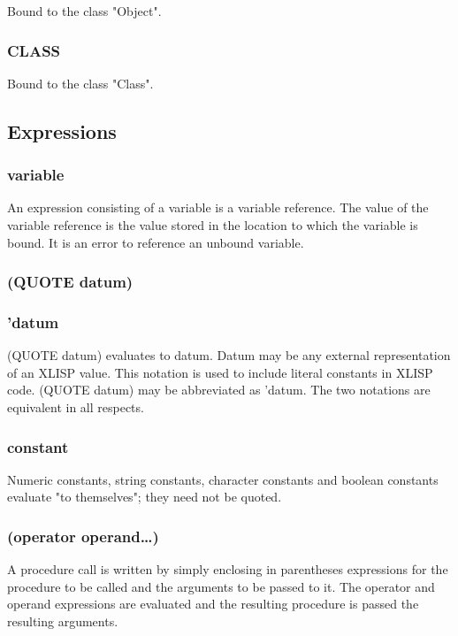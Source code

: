 \documentclass[11pt]{article}
\begin{document}
Bound to the class "Object".
\subsubsection{CLASS}
\label{sec-4-2-17}

Bound to the class "Class".
\subsection{Expressions}
\label{sec-4-3}

\subsubsection{variable}
\label{sec-4-3-1}

An expression consisting of a variable is a variable reference.  The
value of the variable reference is the value stored in the location
to which the variable is bound.  It is an error to reference an
unbound variable.
\subsubsection{(QUOTE datum)}
\label{sec-4-3-2}
\subsubsection{'datum}
\label{sec-4-3-3}

(QUOTE datum) evaluates to datum.  Datum may be any external
representation of an XLISP value.  This notation is used to include
literal constants in XLISP code.  (QUOTE datum) may be abbreviated as
'datum.  The two notations are equivalent in all respects.
\subsubsection{constant}
\label{sec-4-3-4}

Numeric constants, string constants, character constants and boolean
constants evaluate "to themselves"; they need not be quoted.
\subsubsection{(operator operand\ldots{})}
\label{sec-4-3-5}

A procedure call is written by simply enclosing in parentheses
expressions for the procedure to be called and the arguments to be
passed to it. The operator and operand expressions are evaluated and
the resulting procedure is passed the resulting arguments.
\end{document}
